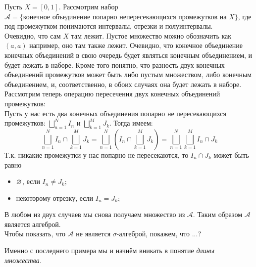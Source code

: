 \begin{example}
    \label{length example}
    Пусть $X = [0, 1]$. Рассмотрим набор $\mathcal{A} = \{\text{конечное объединение попарно непересекающихся
    промежутков на $X$}\}$, где под промежутком понимаются интервалы, отрезки и полуинтервалы.\\
    Очевидно, что сам $X$ там лежит. Пустое множество можно обозначить как $(a, a)$ например, оно там также лежит.
    Очевидно, что конечное объединение конечных объединений в свою очередь будет являться конечным объединением, и
    будет лежать в наборе. Кроме того понятно, что разность двух конечных объединений промежутков может быть либо
    пустым множеством, либо конечным объединением, и, соответственно, в обоих случаях она будет лежать в наборе.
    Рассмотрим теперь операцию пересечения двух конечных объединений промежутков:\\
    Пусть у нас есть два конечных объединения попарно не пересекающихся промежутков: $\bigsqcup_{n = 1}^N I_n$
    и $\bigsqcup_{k = 1}^M J_k$. Тогда имеем:
    \[
        \bigsqcup_{n = 1}^N I_n \cap \bigsqcup_{k = 1}^M J_k =
        \bigsqcup_{n = 1}^N \left( I_n \cap \bigsqcup_{k = 1}^M J_k \right) =
        \bigsqcup_{n = 1}^N \bigsqcup_{k = 1}^M I_n \cap J_k
    \]
    Т.к. никакие промежутки у нас попарно не пересекаются, то $I_n \cap J_k$ может быть равно
    \begin{itemize}
        \item $\varnothing$, если $I_n \neq J_k$;
        \item некоторому отрезку, если $I_n = J_k$;
    \end{itemize}
    В любом из двух случаев мы снова получаем множество из $\mathcal{A}$. Таким образом $\mathcal{A}$ является
    алгеброй.\\
    Чтобы показать, что $\mathcal{A}$ не является $\sigma$-алгеброй, покажем, что ...?
\end{example}
Именно с последнего примера мы и начнём вникать в понятие \it{длины множества}.

